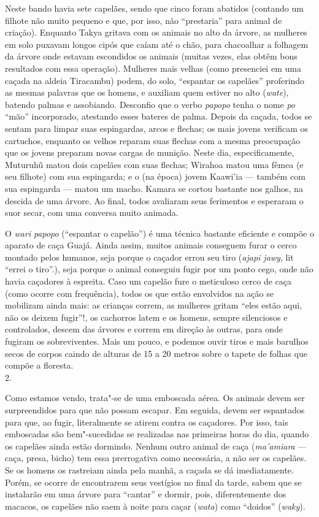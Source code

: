 Neste bando havia sete capelães, sendo que cinco foram abatidos
(contando um filhote não muito pequeno e que, por isso, não ``prestaria''
para animal de criação). Enquanto Takya gritava com os animais no alto
da árvore, as mulheres em solo puxavam longos cipós que caíam até o
chão, para chacoalhar a folhagem da árvore onde estavam escondidos os
animais (muitas vezes, elas obtêm bons resultados com essa operação).
Mulheres mais velhas (como presenciei em uma caçada na aldeia Tiracambu)
podem, do solo, ``espantar os capelães'' proferindo as mesmas palavras que
os homens, e auxiliam quem estiver no alto (\emph{wate}), batendo palmas
e assobiando. Desconfio que o verbo \emph{papopo} tenha o nome \emph{po}
``mão'' incorporado, atestando esses bateres de palma. Depois da caçada,
todos se sentam para limpar suas espingardas, arcos e flechas; os mais
jovens verificam os cartuchos, enquanto os velhos reparam suas flechas
com a mesma preocupação que os jovens preparam novas cargas de munição.
Neste dia, especificamente, Muturuhũ matou dois capelães com suas
flechas; Wirahoa matou uma fêmea (e seu filhote) com sua espingarda; e o
(na época) jovem Kaawi'ia --- também com sua espingarda --- matou um macho.
Kamara se cortou bastante nos galhos, na descida de uma árvore. Ao
final, todos avaliaram seus ferimentos e esperaram o suor secar, com uma
conversa muito animada.

O \emph{wari} \emph{papopo} (``espantar o capelão'') é uma técnica
bastante eficiente e compõe o aparato de caça Guajá. Ainda assim, muitos
animais conseguem furar o cerco montado pelos humanos, seja porque o
caçador errou seu tiro (\emph{ajapi jawy}, lit ``errei o tiro''.), seja
porque o animal conseguiu fugir por um ponto cego, onde não havia
caçadores à espreita. Caso um capelão fure o meticuloso cerco de caça
(como ocorre com frequência), todos os que estão envolvidos na ação se
mobilizam ainda mais: as crianças correm, as mulheres gritam ``eles estão
aqui, não os deixem fugir''!, os cachorros latem e os homens, sempre
silenciosos e controlados, descem das árvores e correm em direção às
outras, para onde fugiram os sobreviventes. Mais um pouco, e podemos
ouvir tiros e mais barulhos secos de corpos caindo de alturas de 15 a 20
metros sobre o tapete de folhas que compõe a floresta.
\\

2.

Como estamos vendo, trata"-se de uma emboscada aérea. Os animais devem
ser surpreendidos para que não possam escapar. Em seguida, devem ser
espantados para que, ao fugir, literalmente se atirem contra os
caçadores. Por isso, tais emboscadas são bem"-sucedidas se realizadas nas
primeiras horas do dia, quando os capelães ainda estão dormindo. Nenhum
outro animal de caça (\emph{ma'amiara} --- caça, presa, bicho) tem essa
prerrogativa como necessária, a não ser os capelães. Se os homens os
rastreiam ainda pela manhã, a caçada se dá imediatamente. Porém, se
ocorre de encontrarem seus vestígios no final da tarde, sabem que se
instalarão em uma árvore para ``cantar'' e dormir, pois, diferentemente
dos macacos, os capelães não saem à noite para caçar (\emph{wata}) como
``doidos'' (\emph{waky}).

